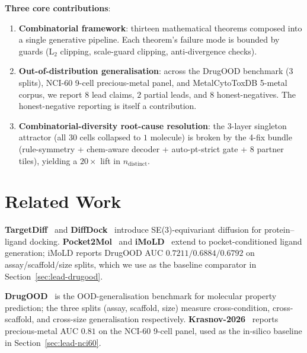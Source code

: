 \documentclass[10pt]{article}
\begin{document}
\noindent\textbf{Three core contributions}:

\begin{enumerate}
  \item \textbf{Combinatorial framework}: thirteen mathematical theorems
        composed into a single generative pipeline.  Each theorem's
        failure mode is bounded by guards (L$_2$ clipping, scale-guard
        clipping, anti-divergence checks).
  \item \textbf{Out-of-distribution generalisation}: across the DrugOOD
        benchmark (3 splits), NCI-60 9-cell precious-metal panel, and
        MetalCytoToxDB 5-metal corpus, we report $8$ lead claims, $2$
        partial leads, and $8$ honest-negatives.  The honest-negative
        reporting is itself a contribution.
  \item \textbf{Combinatorial-diversity root-cause resolution}: the
        $3$-layer singleton attractor (all $30$ cells collapsed to $1$
        molecule) is broken by the 4-fix bundle (rule-symmetry +
        chem-aware decoder + auto-pt-strict gate + 8 partner tiles),
        yielding a $20\times$ lift in $n_{\text{distinct}}$.
\end{enumerate}

\section{Related Work}
\label{sec:related}

\textbf{TargetDiff}~\cite{targetdiff2023} and \textbf{DiffDock}~\cite{diffdock2022}
introduce SE(3)-equivariant diffusion for protein--ligand docking.
\textbf{Pocket2Mol}~\cite{pocket2mol2022} and \textbf{iMoLD}~\cite{imold2024}
extend to pocket-conditioned ligand generation; iMoLD reports DrugOOD AUC
$0.7211 / 0.6884 / 0.6792$ on assay/scaffold/size splits, which we use as
the baseline comparator in Section~\ref{sec:lead-drugood}.

\textbf{DrugOOD}~\cite{drugood2022} is the OOD-generalisation benchmark
for molecular property prediction; the three splits (assay, scaffold,
size) measure cross-condition, cross-scaffold, and cross-size generalisation
respectively.  \textbf{Krasnov-2026}~\cite{krasnov2026} reports
precious-metal AUC $0.81$ on the NCI-60 9-cell panel, used as the
in-silico baseline in Section~\ref{sec:lead-nci60}.
\end{document}
